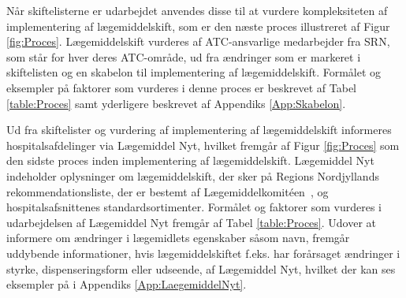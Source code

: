 Når skiftelisterne er udarbejdet anvendes disse til at vurdere kompleksiteten af implementering af lægemiddelskift, som er den næste proces illustreret af Figur \ref{fig:Proces}. Lægemiddelskift vurderes af ATC-ansvarlige medarbejder fra SRN, som står for hver deres ATC-område, ud fra ændringer som er markeret i skiftelisten og en skabelon til implementering af lægemiddelskift. Formålet og eksempler på faktorer som vurderes i denne proces er beskrevet af Tabel \ref{table:Proces} samt yderligere beskrevet af Appendiks \ref{App:Skabelon}.

Ud fra skiftelister og vurdering af implementering af lægemiddelskift informeres hospitalsafdelinger via Lægemiddel Nyt, hvilket fremgår af Figur \ref{fig:Proces} som den sidste proces inden implementering af lægemiddelskift. Lægemiddel Nyt indeholder oplysninger om lægemiddelskift, der sker på Regions Nordjyllands rekommendationsliste, der er bestemt af Lægemiddelkomitéen~\citep{RegionNordjylland2018}, og hospitalsafsnittenes standardsortimenter. Formålet og faktorer som vurderes i udarbejdelsen af Lægemiddel Nyt fremgår af Tabel \ref{table:Proces}. Udover at informere om ændringer i lægemidlets egenskaber såsom navn, fremgår uddybende informationer, hvis lægemiddelskiftet f.eks. har forårsaget ændringer i styrke, dispenseringsform eller udseende, af Lægemiddel Nyt, hvilket der kan ses eksempler på i Appendiks \ref{App:LaegemiddelNyt}.














